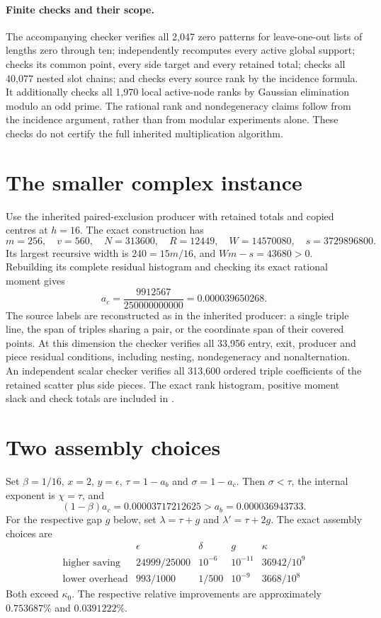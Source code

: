 \documentclass[11pt]{article}
\begin{document}
\paragraph{Finite checks and their scope.}
The accompanying checker verifies all 2,047 zero patterns for leave-one-out
lists of lengths zero through ten; independently recomputes every active global
support; checks its common point, every side target and every retained total;
checks all 40,077 nested slot chains; and checks every source rank by the incidence
formula. It additionally checks all 1,970 local active-node ranks by Gaussian
elimination modulo an odd prime. The rational rank and nondegeneracy claims
follow from the incidence argument, rather than from modular experiments alone.
These checks do not certify the full inherited multiplication algorithm.


\section{The smaller complex instance}
Use the inherited paired-exclusion producer with retained totals and copied
centres at $h=16$. The exact construction has
\[
 m=256,\quad v=560,\quad N=313600,\quad R=12449,\quad
 W=14570080,\quad s=3729896800.
\]
Its largest recursive width is $240=15m/16$, and
$Wm-s=43680>0$. Rebuilding its complete residual histogram and checking
its exact rational moment gives
\[
 a_c=\frac{9912567}{250000000000}=0.000039650268.
\]
The source labels are reconstructed as in the inherited producer: a single
triple line, the span of triples sharing a pair, or the coordinate span of
their covered points. At this dimension the checker verifies all 33,956
entry, exit, producer and piece residual conditions, including nesting,
nondegeneracy and nonalternation. An independent scalar checker verifies all
313,600 ordered triple coefficients of the retained scatter plus side pieces.
The exact rank histogram, positive moment slack and check totals are included
in .

\section{Two assembly choices}
Set $\beta=1/16$, $x=2$, $y=\epsilon$, $\tau=1-a_b$ and $\sigma=1-a_c$.
Then $\sigma<\tau$, the internal exponent is $\chi=\tau$, and
\[
 (1-\beta)a_c=0.00003717212625>a_b=0.000036943733.
\]
For the respective gap $g$ below, set
$\lambda=\tau+g$ and $\lambda'=\tau+2g$.
The exact assembly choices are
\[
\begin{array}{c|c|c|c|c}
 &\epsilon&\delta&g&\kappa\\\hline
 \text{higher saving}&24999/25000&10^{-6}&10^{-11}&36942/10^9\\
 \text{lower overhead}&993/1000&1/500&10^{-9}&3668/10^8
\end{array}
\]
Both exceed $\kappa_0$. The respective relative improvements are approximately
$0.753687\%$ and $0.0391222\%$.
\end{document}
